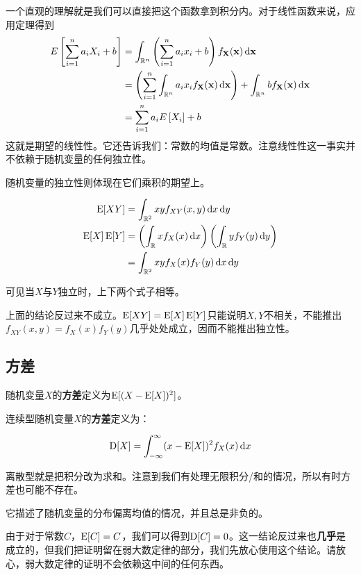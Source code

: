 一个直观的理解就是我们可以直接把这个函数拿到积分内。对于线性函数来说，应用定理得到
\begin{align*}
E\left[\sum_{i=1}^n a_i X_i + b\right]
&= \int_{\mathbb{R}^n} \left( \sum_{i=1}^n a_i x_i + b \right) f_{\mathbf{X}}(\mathbf{x}) \mathop{}\!\mathrm{d}\mathbf{x} \\
&= \left(\sum_{i=1}^n\int_{\mathbb{R}^n}   a_i x_i  f_{\mathbf{X}}(\mathbf{x}) \mathop{}\!\mathrm{d}\mathbf{x} \right)
   + \int_{\mathbb{R}^n} b f_{\mathbf{X}}(\mathbf{x}) \mathop{}\!\mathrm{d}\mathbf{x}\\
&= \sum_{i=1}^n a_i E\left[X_i\right] +b 
\end{align*}
这就是期望的线性性。它还告诉我们：常数的均值是常数。注意线性性这一事实并不依赖于随机变量的任何独立性。

随机变量的独立性则体现在它们乘积的期望上。

\begin{align*}
\operatorname{E}[XY] &= \int_{\mathbb{R}^2} xy f_{XY}(x,y) \mathop{}\!\mathrm{d} x\mathop{}\!\mathrm{d} y\\
\operatorname{E}[X]\operatorname{E}[Y] &= \left(\int_{\mathbb{R}} x f_{X}(x) \mathop{}\!\mathrm{d} x\right) \left(\int_{\mathbb{R}} y f_{Y}(y)\mathop{}\!\mathrm{d} y\right)\\
&= \int_{\mathbb{R}^2} xy f_{X}(x)f_{Y}(y) \mathop{}\!\mathrm{d} x\mathop{}\!\mathrm{d} y
\end{align*}

可见当$X$与$Y$独立时，上下两个式子相等。

\begin{attention}
上面的结论反过来不成立。$\operatorname{E}[XY]=\operatorname{E}[X]\operatorname{E}[Y]$只能说明$X,Y$不相关，不能推出$f_{XY}(x,y)=f_X(x)f_Y(y)$几乎处处成立，因而不能推出独立性。
\end{attention}

\subsection{方差}

随机变量$X$的\textbf{方差}定义为$\operatorname{E}[(X-\operatorname{E}[X])^2]$。

连续型随机变量$X$的\textbf{方差}定义为：

\[
\operatorname{D}[X]=\int_{-\infty}^{\infty} (x-\operatorname{E}[X])^2f_X(x)\mathop{}\!\mathrm{d} x
\]

离散型就是把积分改为求和。注意到我们有处理无限积分/和的情况，所以有时方差也可能不存在。

它描述了随机变量的分布偏离均值的情况，并且总是非负的。

由于对于常数$C$，$\operatorname{E}[C]=C$，我们可以得到$\operatorname{D}[C]=0$。这一结论反过来也\textbf{几乎}是成立的，但我们把证明留在弱大数定律的部分，我们先放心使用这个结论。请放心，弱大数定律的证明不会依赖这中间的任何东西。

